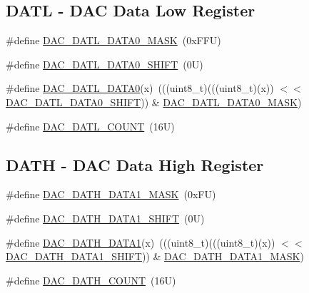\subsection*{D\+A\+TL -\/ D\+AC Data Low Register}
\begin{DoxyCompactItemize}
\item 
\#define \mbox{\hyperlink{group___d_a_c___register___masks_ga06d752efe9ec5bab7d61ccf9c2689345}{D\+A\+C\+\_\+\+D\+A\+T\+L\+\_\+\+D\+A\+T\+A0\+\_\+\+M\+A\+SK}}~(0x\+F\+F\+U)
\item 
\#define \mbox{\hyperlink{group___d_a_c___register___masks_gad9030129a0f34502c115abd36728d001}{D\+A\+C\+\_\+\+D\+A\+T\+L\+\_\+\+D\+A\+T\+A0\+\_\+\+S\+H\+I\+FT}}~(0\+U)
\item 
\#define \mbox{\hyperlink{group___d_a_c___register___masks_ga87995bd867b0ea7e137b5a5a8cbfdf1e}{D\+A\+C\+\_\+\+D\+A\+T\+L\+\_\+\+D\+A\+T\+A0}}(x)~(((uint8\+\_\+t)(((uint8\+\_\+t)(x)) $<$$<$ \mbox{\hyperlink{group___d_a_c___register___masks_gad9030129a0f34502c115abd36728d001}{D\+A\+C\+\_\+\+D\+A\+T\+L\+\_\+\+D\+A\+T\+A0\+\_\+\+S\+H\+I\+FT}})) \& \mbox{\hyperlink{group___d_a_c___register___masks_ga06d752efe9ec5bab7d61ccf9c2689345}{D\+A\+C\+\_\+\+D\+A\+T\+L\+\_\+\+D\+A\+T\+A0\+\_\+\+M\+A\+SK}})
\item 
\#define \mbox{\hyperlink{group___d_a_c___register___masks_gaa16ae55ea8545fdeea11d28e84768d98}{D\+A\+C\+\_\+\+D\+A\+T\+L\+\_\+\+C\+O\+U\+NT}}~(16\+U)
\end{DoxyCompactItemize}
\subsection*{D\+A\+TH -\/ D\+AC Data High Register}
\begin{DoxyCompactItemize}
\item 
\#define \mbox{\hyperlink{group___d_a_c___register___masks_ga98c0e999ae86d666b5d6fa8df700ba6f}{D\+A\+C\+\_\+\+D\+A\+T\+H\+\_\+\+D\+A\+T\+A1\+\_\+\+M\+A\+SK}}~(0x\+F\+U)
\item 
\#define \mbox{\hyperlink{group___d_a_c___register___masks_ga0056432036b350d3839554982acfbff1}{D\+A\+C\+\_\+\+D\+A\+T\+H\+\_\+\+D\+A\+T\+A1\+\_\+\+S\+H\+I\+FT}}~(0\+U)
\item 
\#define \mbox{\hyperlink{group___d_a_c___register___masks_ga22ebc926dfe59f28a37b532767780fbc}{D\+A\+C\+\_\+\+D\+A\+T\+H\+\_\+\+D\+A\+T\+A1}}(x)~(((uint8\+\_\+t)(((uint8\+\_\+t)(x)) $<$$<$ \mbox{\hyperlink{group___d_a_c___register___masks_ga0056432036b350d3839554982acfbff1}{D\+A\+C\+\_\+\+D\+A\+T\+H\+\_\+\+D\+A\+T\+A1\+\_\+\+S\+H\+I\+FT}})) \& \mbox{\hyperlink{group___d_a_c___register___masks_ga98c0e999ae86d666b5d6fa8df700ba6f}{D\+A\+C\+\_\+\+D\+A\+T\+H\+\_\+\+D\+A\+T\+A1\+\_\+\+M\+A\+SK}})
\item 
\#define \mbox{\hyperlink{group___d_a_c___register___masks_gafce897f56e48f350a733e28b92be7e4c}{D\+A\+C\+\_\+\+D\+A\+T\+H\+\_\+\+C\+O\+U\+NT}}~(16\+U)
\end{DoxyCompactItemize}
